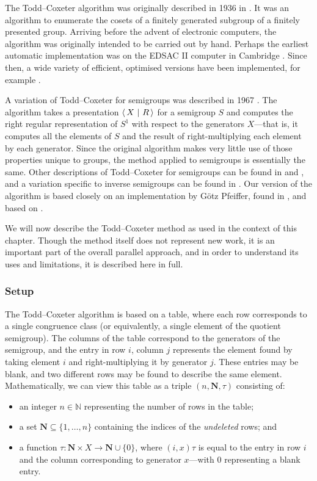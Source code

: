 The Todd--Coxeter algorithm was originally described in 1936 in
\cite{todd_coxeter_1936}.  It was an algorithm to enumerate the cosets of a
finitely generated subgroup of a finitely presented group.  Arriving before the
advent of electronic computers, the algorithm was originally intended to be
carried out by hand.  Perhaps the earliest automatic implementation was on the
EDSAC II computer in Cambridge \cite{leech_1963}.  Since then, a wide variety of
efficient, optimised versions have been implemented, for example \cite{ace}.

A variation of Todd--Coxeter for semigroups was described in 1967
\cite{neumann_1967}.  The algorithm takes a presentation $\left\langle\,X ~\middle|~ R\,\right\rangle$
for a semigroup $S$ and computes the right regular representation of $S^1$ with
respect to the generators $X$---that is, it computes all the elements of $S$ and
the result of right-multiplying each element by each generator.  Since the
original algorithm makes very little use of those properties unique to groups,
the method applied to semigroups is essentially the same.  Other descriptions of
Todd--Coxeter for semigroups can be found in \cite[Chapter 12]{ruskuc_thesis} and
\cite[Chapter 1.2]{walker_thesis}, and a variation specific to inverse
semigroups can be found in \cite{cutting_thesis}.  Our version of the algorithm
is based closely on an implementation by G\"otz Pfeiffer, found in
\cite[\texttt{lib/tcsemi.gi}]{gap}, and based on \cite{walker_thesis}.

We will now describe the Todd--Coxeter method as used in the context of this
chapter.  Though the method itself does not represent new work, it is an
important part of the overall parallel approach, and in order to understand its
uses and limitations, it is described here in full.

\subsubsection{Setup}

The Todd--Coxeter algorithm is based on a table, where each row corresponds to a
single congruence class (or equivalently, a single element of the quotient
semigroup).  The columns of the table correspond to the generators of the
semigroup, and the entry in row $i$, column $j$ represents the element found by
taking element $i$ and right-multiplying it by generator $j$.  These entries may
be blank, and two different rows may be found to describe the same element.
Mathematically, we can view this table as a triple $(n, \mathbf{N}, \tau)$
consisting of:
\begin{itemize}
\item an integer $n \in \mathbb{N}$ representing the number of rows in the table;
\item a set $\mathbf{N} \subseteq \{1, \ldots, n\}$ containing the indices of the
  \textit{undeleted} rows; and
\item a function $\tau: \mathbf{N} \times X \to \mathbf{N} \cup \{0\}$, where
  $(i, x)\tau$ is equal to the entry in row $i$ and the column corresponding to
  generator $x$---with $0$ representing a blank entry.
\end{itemize}

